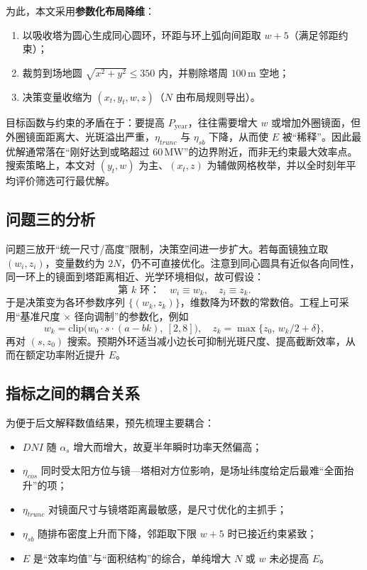 \documentclass[withoutpreface,bwprint]{cumcmthesis}
\begin{document}
为此，本文采用\textbf{参数化布局降维}：
\begin{enumerate}[leftmargin=2em]
  \item 以吸收塔为圆心生成同心圆环，环距与环上弧向间距取 $w+5$（满足邻距约束）；
  \item 裁剪到场地圆 $\sqrt{x^2+y^2}\le350$ 内，并剔除塔周 $100\,\mathrm{m}$ 空地；
  \item 决策变量收缩为 $(x_t,y_t,w,z)$（$N$ 由布局规则导出）。
\end{enumerate}

目标函数与约束的矛盾在于：要提高 $P_{\mathrm{year}}$，往往需要增大 $w$ 或增加外圈镜面，但外圈镜面距离大、光斑溢出严重，$\eta_{trunc}$ 与 $\eta_{sb}$ 下降，从而使 $E$ 被“稀释”。因此最优解通常落在“刚好达到或略超过 $60\,\mathrm{MW}$”的边界附近，而非无约束最大效率点。搜索策略上，本文对 $(y_t,w)$ 为主、$(x_t,z)$ 为辅做网格枚举，并以全时刻年平均评价筛选可行最优解。

\subsection{问题三的分析}
问题三放开“统一尺寸/高度”限制，决策空间进一步扩大。若每面镜独立取 $(w_i,z_i)$，变量数约为 $2N$，仍不可直接优化。注意到同心圆具有近似各向同性，同一环上的镜面到塔距离相近、光学环境相似，故可假设：
\begin{equation}
\text{第 }k\text{ 环：}\quad w_i\equiv w_k,\quad z_i\equiv z_k.
\end{equation}
于是决策变为各环参数序列 $\{ (w_k,z_k) \}$，维数降为环数的常数倍。工程上可采用“基准尺度 $\times$ 径向调制”的参数化，例如
\begin{equation}
w_k = \mathrm{clip}\!\bigl(w_0\cdot s\cdot (a-b k),\ [2,8]\bigr),\quad
z_k=\max\{z_0,\, w_k/2+\delta\},
\end{equation}
再对 $(s,z_0)$ 搜索。预期外环适当减小边长可抑制光斑尺度、提高截断效率，从而在额定功率附近提升 $E$。

\subsection{指标之间的耦合关系}
为便于后文解释数值结果，预先梳理主要耦合：
\begin{itemize}[leftmargin=2em]
  \item $DNI$ 随 $\alpha_s$ 增大而增大，故夏半年瞬时功率天然偏高；
  \item $\eta_{cos}$ 同时受太阳方位与镜—塔相对方位影响，是场址纬度给定后最难“全面抬升”的项；
  \item $\eta_{trunc}$ 对镜面尺寸与镜塔距离最敏感，是尺寸优化的主抓手；
  \item $\eta_{sb}$ 随排布密度上升而下降，邻距取下限 $w+5$ 时已接近约束紧致；
  \item $E$ 是“效率均值”与“面积结构”的综合，单纯增大 $N$ 或 $w$ 未必提高 $E$。
\end{itemize}
\end{document}

